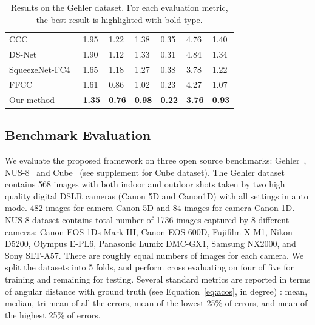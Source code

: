 \documentclass[10pt,twocolumn,letterpaper]{article}
\begin{document}
\begin{table}[b]
{\begin{tabular}{l|llllll}
CCC~\cite{barron2015convolutional}& 1.95 & 1.22 & 1.38 & 0.35 & 4.76 & 1.40\\
DS-Net~\cite{shi2016deep}& 1.90 & 1.12 & 1.33 & 0.31 & 4.84 & 1.34\\
SqueezeNet-FC4~\cite{hu2017fc}& 1.65 & 1.18 & 1.27 & 0.38 & 3.78 & 1.22\\
FFCC~\cite{DBLP:journals/corr/BarronT16}& 1.61 & 0.86 & 1.02 & 0.23 & 4.27 & 1.07\\
\hline
Our method & \textbf{1.35} & \textbf{0.76} & \textbf{0.98} & \textbf{0.22} & \textbf{3.76} & \textbf{0.93} \\
\hline
\end{tabular}
}
\caption{Results on the Gehler dataset.
For each evaluation metric, the best result is highlighted with bold type.}
\label{table_gehler}
\end{table}

\subsection{Benchmark Evaluation}
\label{subsection_benchmarks}

We evaluate the proposed framework on three open source benchmarks: Gehler~\cite{gehler2008bayesian},
NUS-8~\cite{cheng2014illuminant} and Cube~\cite{DBLP:journals/corr/abs-1712-00436} (see supplement for Cube dataset).
The Gehler dataset contains 568 images with both indoor and
outdoor shots taken by two high quality digital DSLR cameras (Canon 5D and Canon1D) with all settings in auto mode.
482 images for camera Canon 5D and 84 images for camera Canon 1D.
NUS-8 dataset contains total number of 1736 images captured by 8 different cameras: Canon EOS-1Ds Mark III,
Canon EOS 600D, Fujifilm X-M1, Nikon D5200, Olympus E-PL6, Panasonic Lumix DMC-GX1, Samsung NX2000, and Sony SLT-A57.
There are roughly equal numbers of images for each camera.
We split the datasets into 5 folds, and perform cross evaluating on four of five for training and remaining for testing.
Several standard metrics are reported in terms of angular distance with ground truth (see Equation~\ref{eq:acos}, in degree) :
mean, median, tri-mean of all the errors,
mean of the lowest 25\% of errors, and mean of the highest 25\% of errors.
\end{document}
